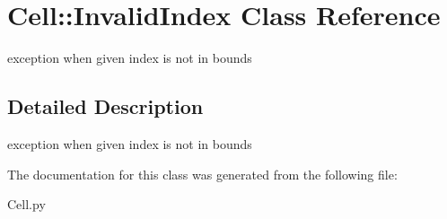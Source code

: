 \section{Cell::Invalid\-Index Class Reference}
\label{classCell_1_1InvalidIndex}
exception when given index is not in bounds  




\subsection{Detailed Description}
exception when given index is not in bounds 



The documentation for this class was generated from the following file:\begin{CompactItemize}
\item 
Cell.py\end{CompactItemize}
